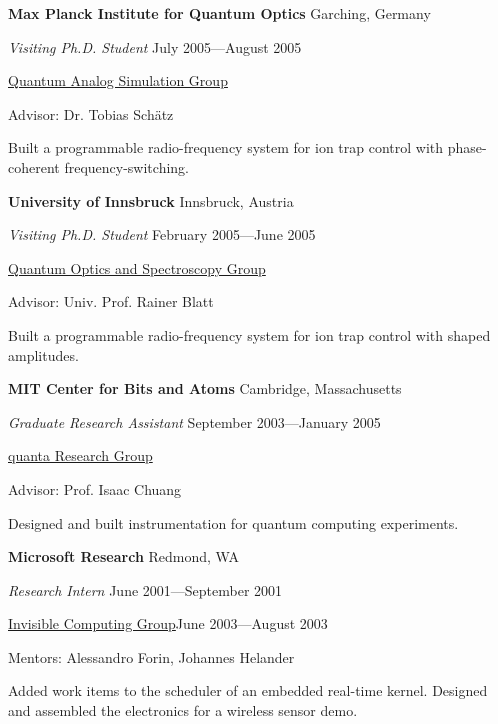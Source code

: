 \documentclass[letter]{article}
\begin{document}
\par

\vspace{\baselineskip}
\par
{\bf Max Planck Institute for Quantum Optics} \hfill Garching, Germany
\par
{\em Visiting Ph.D. Student} \hfill July 2005---August 2005
\par
\href{http://www.mpq.mpg.de/qsim/}{Quantum Analog Simulation Group}
\par
Advisor: Dr. Tobias Sch\"atz
\par
Built a programmable radio-frequency system for ion trap control with phase-coherent
frequency-switching.

\par

\vspace{\baselineskip}
\par
{\bf University of Innsbruck} \hfill Innsbruck, Austria
\par
{\em Visiting Ph.D. Student} \hfill February 2005---June 2005
\par
\href{http://heart-c704.uibk.ac.at/index.html}{Quantum Optics and Spectroscopy Group}
\par
Advisor: Univ. Prof. Rainer Blatt
\par
Built a programmable radio-frequency system for ion trap control with shaped amplitudes.
\par

\vspace{\baselineskip}
\par
{\bf MIT Center for Bits and Atoms} \hfill Cambridge, Massachusetts
\par
{\em Graduate Research Assistant} \hfill September 2003---January 2005
\par
\href{http://web.mit.edu/~cua/www/quanta/}{quanta Research Group}
\par
Advisor: Prof. Isaac Chuang
\par
Designed and built instrumentation for quantum computing experiments.
\par

\vspace{\baselineskip}
\par
{\bf Microsoft Research} \hfill Redmond, WA
\par
{\em Research Intern} \hfill June 2001---September 2001
\par
\href{http://research.microsoft.com/en-us/projects/mic/default.aspx}{Invisible Computing Group}\hfill June 2003---August 2003
\par
Mentors: Alessandro Forin, Johannes Helander
\par
Added work items to the scheduler of an embedded real-time kernel.
Designed and assembled the electronics for a wireless sensor demo.
\end{document}
